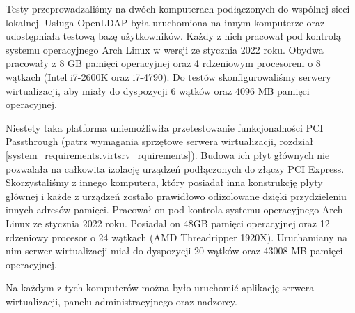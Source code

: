 \documentclass[../analiza-rozwiazania.tex]{subfiles}
\begin{document}
Testy przeprowadzaliśmy na dwóch komputerach podłączonych do wspólnej sieci lokalnej.
Usługa OpenLDAP była uruchomiona na innym komputerze oraz udostępniała testową bazę użytkowników.
Każdy z nich pracował pod kontrolą systemu operacyjnego Arch Linux w wersji ze stycznia 2022 roku.
Obydwa pracowały z 8 GB pamięci operacyjnej oraz 4 rdzeniowym procesorem o 8 wątkach (Intel i7-2600K oraz i7-4790).
Do testów skonfigurowaliśmy serwery wirtualizacji, aby miały do dyspozycji 6 wątków oraz 4096 MB pamięci operacyjnej.

Niestety taka platforma uniemożliwiła przetestowanie funkcjonalności PCI Passthrough (patrz wymagania sprzętowe serwera wirtualizacji, rozdział \ref{system_requirements.virtsrv_rquirements}).
Budowa ich płyt głównych nie pozwalała na całkowita izolację urządzeń podłączonych do złączy PCI Express.
Skorzystaliśmy z innego komputera, który posiadał inna konstrukcję płyty głównej i każde z urządzeń zostało prawidłowo odizolowane dzięki przydzieleniu innych adresów pamięci.
Pracował on pod kontrola systemu operacyjnego Arch Linux ze stycznia 2022 roku.
Posiadał on 48GB pamięci operacyjnej oraz 12 rdzeniowy procesor o 24 wątkach (AMD Threadripper 1920X).
Uruchamiany na nim serwer wirtualizacji miał do dyspozycji 20 wątków oraz 43008 MB pamięci operacyjnej.

Na każdym z tych komputerów można było uruchomić aplikację serwera wirtualizacji, panelu administracyjnego oraz nadzorcy.
\end{document}
